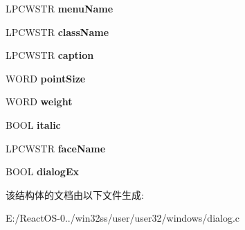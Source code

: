 \begin{DoxyCompactItemize}
L\+P\+C\+W\+S\+TR {\bfseries menu\+Name}
\item 
\mbox{\label{struct_d_l_g___t_e_m_p_l_a_t_e_adb730ae72f79663bafeb8f26ca4ed03d}} 
L\+P\+C\+W\+S\+TR {\bfseries class\+Name}
\item 
\mbox{\label{struct_d_l_g___t_e_m_p_l_a_t_e_a615012986bc5c5c172c294e4da024b74}} 
L\+P\+C\+W\+S\+TR {\bfseries caption}
\item 
\mbox{\label{struct_d_l_g___t_e_m_p_l_a_t_e_a57f4906784ae1318b531ad292b909c91}} 
W\+O\+RD {\bfseries point\+Size}
\item 
\mbox{\label{struct_d_l_g___t_e_m_p_l_a_t_e_a411b0492fbe52768c9cba6f3eeeeb18c}} 
W\+O\+RD {\bfseries weight}
\item 
\mbox{\label{struct_d_l_g___t_e_m_p_l_a_t_e_a31754bea2abf673a48d49eb0e42d8fbc}} 
B\+O\+OL {\bfseries italic}
\item 
\mbox{\label{struct_d_l_g___t_e_m_p_l_a_t_e_ac482d8b1e4c637a06409073b3b9390eb}} 
L\+P\+C\+W\+S\+TR {\bfseries face\+Name}
\item 
\mbox{\label{struct_d_l_g___t_e_m_p_l_a_t_e_afc516cd7d2e9555f7a3707d913fa2a67}} 
B\+O\+OL {\bfseries dialog\+Ex}
\end{DoxyCompactItemize}


该结构体的文档由以下文件生成\+:\begin{DoxyCompactItemize}
\item 
E\+:/\+React\+O\+S-\/0../win32ss/user/user32/windows/dialog.\+c\end{DoxyCompactItemize}
